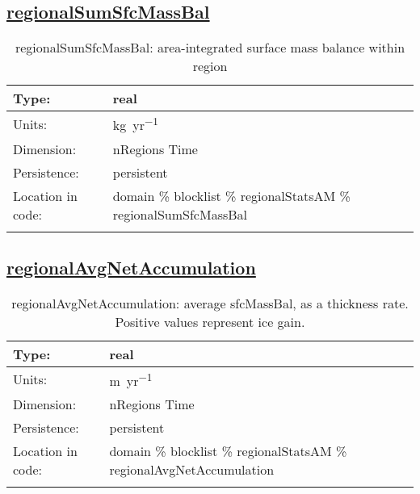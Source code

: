 \subsection[regionalSumSfcMassBal]{\hyperref[sec:var_tab_regionalStatsAM]{regionalSumSfcMassBal}}
\label{subsec:var_sec_regionalStatsAM_regionalSumSfcMassBal}
\begin{center}
\begin{longtable}{| p{2.0in} | p{4.0in} |}
        \hline 
        Type: & real \\
        \hline 
        Units: & \si{kg.yr^{-1}} \\
        \hline 
        Dimension: & nRegions Time \\
        \hline 
        Persistence: & persistent \\
        \hline 
         Location in code: & domain \% blocklist \% regionalStatsAM \% regionalSumSfcMassBal \\
         \hline 
    \caption{regionalSumSfcMassBal: area-integrated surface mass balance within region}
\end{longtable}
\end{center}
\subsection[regionalAvgNetAccumulation]{\hyperref[sec:var_tab_regionalStatsAM]{regionalAvgNetAccumulation}}
\label{subsec:var_sec_regionalStatsAM_regionalAvgNetAccumulation}
\begin{center}
\begin{longtable}{| p{2.0in} | p{4.0in} |}
        \hline 
        Type: & real \\
        \hline 
        Units: & \si{m.yr^{-1}} \\
        \hline 
        Dimension: & nRegions Time \\
        \hline 
        Persistence: & persistent \\
        \hline 
         Location in code: & domain \% blocklist \% regionalStatsAM \% regionalAvgNetAccumulation \\
         \hline 
    \caption{regionalAvgNetAccumulation: average sfcMassBal, as a thickness rate. Positive values represent ice gain.}
\end{longtable}
\end{center}

